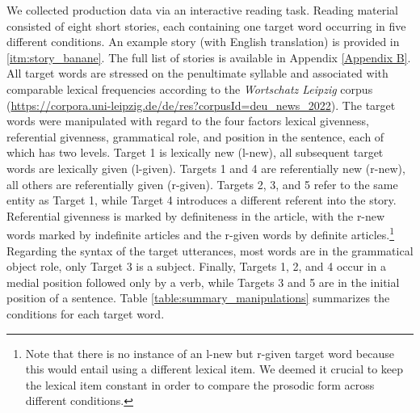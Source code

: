 We collected production data via an interactive reading task. Reading material consisted of eight short stories, each containing one target word occurring in five different conditions. An example story (with English translation) is provided in \ref{itm:story_banane}. The full list of stories is available in Appendix \ref{Appendix B}. All target words are stressed on the penultimate syllable and associated with comparable lexical frequencies according to the \textit{Wortschatz Leipzig} corpus (\url{https://corpora.uni-leipzig.de/de/res?corpusId=deu_news_2022}). The target words were manipulated with regard to the four factors lexical givenness, referential givenness, grammatical role, and position in the sentence, each of which has two levels.
Target 1 is lexically new (l-new), all subsequent target words are lexically given (l-given). Targets 1 and 4 are referentially new (r-new), all others are referentially given (r-given). Targets 2, 3, and 5 refer to the same entity as Target 1, while Target 4 introduces a different referent into the story. Referential givenness is marked by definiteness in the article, with the r-new words marked by indefinite articles and the r-given words by definite articles.\footnote{Note that there is no instance of an l-new but r-given target word because this would entail using a different lexical item. We deemed it crucial to keep the lexical item constant in order to compare the prosodic form across different conditions.} Regarding the syntax of the target utterances, most words are in the grammatical object role, only Target 3 is a subject. Finally, Targets 1, 2, and 4 occur in a medial position followed only by a verb, while Targets 3 and 5 are in the initial position of a sentence. Table \ref{table:summary_manipulations} summarizes the conditions for each target word.

